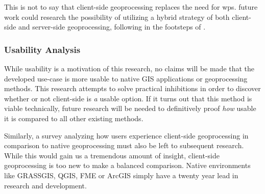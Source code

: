 This is not to say that client-side geoprocessing replaces the need for \ac{wps}. 
future work could research the possibility of utilizing a hybrid strategy of both client-side and server-side geoprocessing, following in the footsteps of \cite{panidi_hybrid_2015}. 



\subsubsection*{Usability Analysis} %

While usability is a motivation of this research, no claims will be made that the developed use-case is more usable to native GIS applications or geoprocessing methods. This research attempts to solve practical inhibitions in order to discover whether or not client-side is \emph{a} usable option. If it turns out that this method is viable technically, future research will be needed to definitively proof \emph{how} usable it is compared to all other existing methods.  


Similarly, a survey analyzing how users experience client-side geoprocessing in comparison to native geoprocessing must also be left to subsequent research. While this would gain us a tremendous amount of insight, client-side geoprocessing is too new to make a balanced comparison. Native environments like GRASSGIS, QGIS, FME or ArcGIS simply have a twenty year lead in research and development. 
